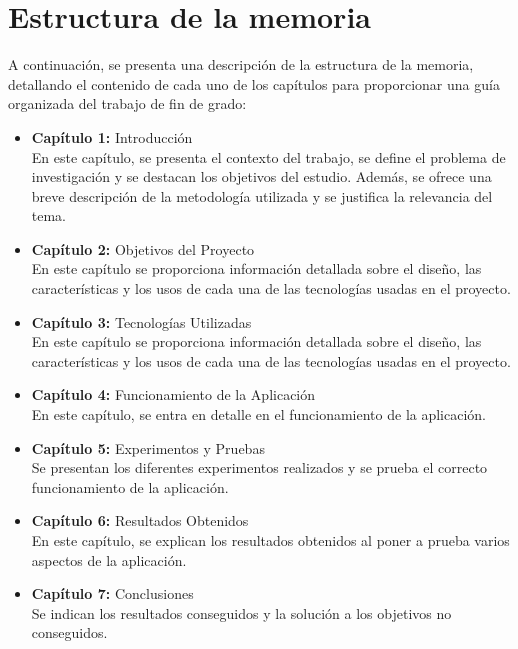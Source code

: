\documentclass[a4paper, 12pt]{book}
\begin{document}
\section{Estructura de la memoria}
\label{sec:seccion}

A continuación, se presenta una descripción de la estructura de la memoria, 
detallando el contenido de cada uno de los capítulos para proporcionar 
una guía organizada del trabajo de fin de grado:

\begin{itemize}
  \item \textbf{Capítulo 1:} Introducción \\
  En este capítulo, se presenta el contexto del trabajo, se define el problema de 
  investigación y se destacan los objetivos del estudio. Además, se ofrece una breve 
  descripción de la metodología utilizada y se justifica la relevancia del tema.
  \item \textbf{Capítulo 2:} Objetivos del Proyecto \\
  En este capítulo se proporciona información detallada sobre el diseño, las 
  características y los usos de cada una de las tecnologías usadas en el proyecto. 

  \item \textbf{Capítulo 3:} Tecnologías Utilizadas \\
  En este capítulo se proporciona información detallada sobre el diseño, las 
  características y los usos de cada una de las tecnologías usadas en el proyecto.

  \item \textbf{Capítulo 4:} Funcionamiento de la Aplicación \\
  En este capítulo, se entra en detalle en el funcionamiento de la aplicación.

  \item \textbf{Capítulo 5:} Experimentos y Pruebas \\
  Se presentan los diferentes experimentos realizados y se prueba el correcto funcionamiento de la aplicación.

  \item \textbf{Capítulo 6:} Resultados Obtenidos \\
  En este capítulo, se explican los resultados obtenidos al poner a prueba varios aspectos de la aplicación.

  \item \textbf{Capítulo 7:} Conclusiones \\
  Se indican los resultados conseguidos y la solución a los objetivos no conseguidos.
\end{itemize}
\end{document}
